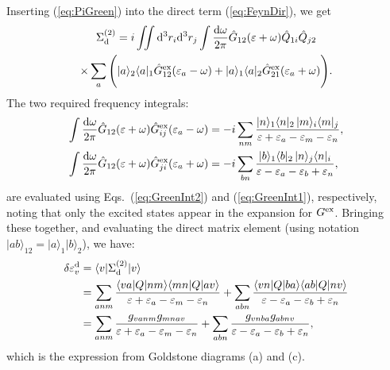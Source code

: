 \documentclass[10pt,twocolumn,a4paper]{article}%
\newcommand{\bra}[1]{\ensuremath{\langle #1|}}	%
\newcommand{\ket}[1]{\ensuremath{|#1\rangle}}
\def\d{\ensuremath{{\rm d}}}
\def\en{\ensuremath{\varepsilon}}
\newcommand{\w}{\ensuremath{\omega}}
\begin{document}
Inserting (\ref{eq:PiGreen}) into the direct term (\ref{eq:FeynDir}), we get
\begin{multline}
\Sigma^{(2)}_{\rm d}
= i\iint\d^3 r_i\d^3 r_j
\int\frac{\d\w}{2\pi}
\hat G_{12}(\en+\w) \hat Q_{1i}\hat Q_{j2}\\
\times \sum_a\Bigg(
\ket{a}_2\bra{a}_1\hat G^{\rm ex}_{12}(\en_a-\w)
+\ket{a}_1\bra{a}_2\hat G^{\rm ex}_{21}(\en_a+\w)
\Bigg).
\end{multline}
%
The two required frequency integrals:
\begin{align}
\begin{split}
\int \frac{\d \w}{2\pi}\hat G_{12}(\en+\w) \hat G^{\rm ex}_{ij}(\en_a - \omega)
&=
-i\sum_{nm}
\frac{\ket{n}_1\bra{n}_2 \, \ket{m}_i\bra{m}_j}{\en+ \en_a - \en_m - \en_n},
\\
\int \frac{\d \w}{2\pi}\hat G_{12}(\en+\w) \hat G^{\rm ex}_{ji}(\en_a + \omega)
&=
-i\sum_{bn}
\frac{\ket{b}_1\bra{b}_2 \, \ket{n}_j\bra{n}_i}{\en - \en_a - \en_b + \en_n},
\end{split}
\end{align}
are evaluated using Eqs.~(\ref{eq:GreenInt2}) and (\ref{eq:GreenInt1}), respectively, noting that only the excited states appear in the expansion for $G^{\rm ex}$.
%
Bringing these together, and evaluating the direct matrix element  (using notation $\ket{ab}_{12}=\ket{a}_1\ket{b}_2$), we have:
\begin{align}
\delta\en_v^{\rm d}&=\bra{v}\Sigma^{(2)}_{\rm d}\ket{v}\notag\\
&=\sum_{anm}\frac{\bra{va}Q\ket{nm} \bra{mn}Q\ket{av}}{\en+\en_a-\en_m-\en_n}
+\sum_{abn}\frac{\bra{vn}Q\ket{ba} \bra{ab}Q\ket{nv}}{\en-\en_a-\en_b+\en_n} \notag\\
&=\sum_{anm}\frac{g_{vanm}g_{mnav}}{\en+\en_a-\en_m-\en_n}
+\sum_{abn}\frac{g_{vnba}g_{abnv}}{\en-\en_a-\en_b+\en_n},
\end{align}
which is the expression from Goldstone diagrams (a) and (c).
\end{document}
